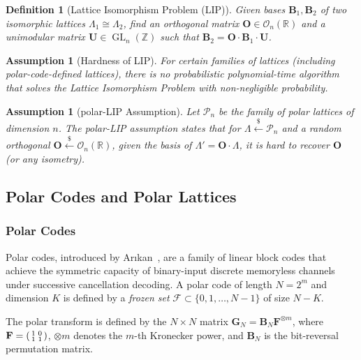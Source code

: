\documentclass[11pt,a4paper]{article}
\newtheorem{definition}[theorem]{Definition}
\newtheorem{assumption}[theorem]{Assumption}
\newcommand{\lipPrb}{\textsf{LIP}\xspace}
\newcommand{\polarLIP}{\textsf{polar-LIP}\xspace}
\newcommand{\Z}{\mathbb{Z}}
\newcommand{\R}{\mathbb{R}}
\DeclareMathOperator{\GL}{GL}
\newcommand{\sample}{\xleftarrow{\$}}
\begin{document}
\begin{definition}[Lattice Isomorphism Problem (\lipPrb)]\label{def:lip}
Given bases $\mathbf{B}_1, \mathbf{B}_2$ of two isomorphic lattices $\Lambda_1 \cong \Lambda_2$, find an orthogonal matrix $\mathbf{O} \in \mathcal{O}_n(\R)$ and a unimodular matrix $\mathbf{U} \in \GL_n(\Z)$ such that $\mathbf{B}_2 = \mathbf{O} \cdot \mathbf{B}_1 \cdot \mathbf{U}$.
\end{definition}

\begin{assumption}[Hardness of \lipPrb]\label{ass:lip}
For certain families of lattices (including polar-code-defined lattices), there is no probabilistic polynomial-time algorithm that solves the Lattice Isomorphism Problem with non-negligible probability.
\end{assumption}

\begin{assumption}[\polarLIP Assumption]\label{ass:polar-lip}
Let $\mathcal{P}_n$ be the family of polar lattices of dimension $n$. The \emph{\polarLIP} assumption states that for $\Lambda \sample \mathcal{P}_n$ and a random orthogonal $\mathbf{O} \sample \mathcal{O}_n(\R)$, given the basis of $\Lambda' = \mathbf{O} \cdot \Lambda$, it is hard to recover $\mathbf{O}$ (or any isometry).
\end{assumption}

\subsection{Polar Codes and Polar Lattices}\label{sec:polar}

\subsubsection{Polar Codes}

Polar codes, introduced by Ar{\i}kan~\cite{Arikan2009}, are a family of linear block codes that achieve the symmetric capacity of binary-input discrete memoryless channels under successive cancellation decoding. A polar code of length $N = 2^m$ and dimension $K$ is defined by a \emph{frozen set} $\mathcal{F} \subset \{0, 1, \ldots, N-1\}$ of size $N - K$.

The polar transform is defined by the $N \times N$ matrix $\mathbf{G}_N = \mathbf{B}_N \mathbf{F}^{\otimes m}$, where $\mathbf{F} = \begin{psmallmatrix} 1 & 0 \\ 1 & 1 \end{psmallmatrix}$, $\otimes m$ denotes the $m$-th Kronecker power, and $\mathbf{B}_N$ is the bit-reversal permutation matrix.
\end{document}
